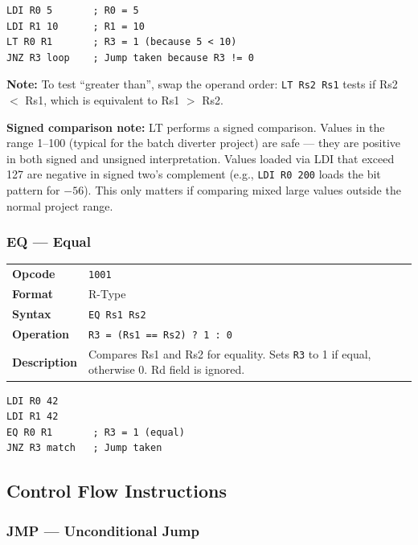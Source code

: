 \documentclass[11pt,a4paper]{article}
\newcommand{\reg}[1]{\texttt{R#1}}
\newcommand{\opcode}[1]{\texttt{#1}}
\begin{document}
\begin{lstlisting}
LDI R0 5       ; R0 = 5
LDI R1 10      ; R1 = 10
LT R0 R1       ; R3 = 1 (because 5 < 10)
JNZ R3 loop    ; Jump taken because R3 != 0
\end{lstlisting}

\textbf{Note:} To test ``greater than'', swap the operand order: \lstinline|LT Rs2 Rs1| tests if Rs2 $<$ Rs1, which is equivalent to Rs1 $>$ Rs2.

\begin{designnote}
\textbf{Signed comparison note:} LT performs a signed comparison. Values in the range 1--100 (typical for the batch diverter project) are safe --- they are positive in both signed and unsigned interpretation. Values loaded via LDI that exceed 127 are negative in signed two's complement (e.g., \lstinline|LDI R0 200| loads the bit pattern for $-56$). This only matters if comparing mixed large values outside the normal project range.
\end{designnote}

\subsubsection{EQ --- Equal}

\begin{table}[H]
\begin{tabularx}{\textwidth}{@{}lX@{}}
\toprule
\textbf{Opcode}      & \opcode{1001} \\
\textbf{Format}      & R-Type \\
\textbf{Syntax}      & \lstinline|EQ Rs1 Rs2| \\
\textbf{Operation}   & \texttt{R3 = (Rs1 == Rs2) ? 1 : 0} \\
\textbf{Description} & Compares Rs1 and Rs2 for equality. Sets \reg{3} to 1 if equal, otherwise 0. Rd field is ignored. \\
\bottomrule
\end{tabularx}
\end{table}

\begin{lstlisting}
LDI R0 42
LDI R1 42
EQ R0 R1       ; R3 = 1 (equal)
JNZ R3 match   ; Jump taken
\end{lstlisting}

\subsection{Control Flow Instructions}

\subsubsection{JMP --- Unconditional Jump}
\end{document}

